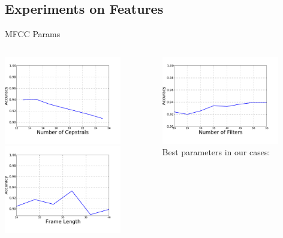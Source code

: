 \subsection{Experiments on Features}
\begin{frame}{MFCC Params}
\begin{columns}[t]
  \begin{column}[t]{0.5\textwidth}
    \begin{center}
    \includegraphics[width=0.8\textwidth]{res/mfcc-nceps.pdf}\\
    \includegraphics[width=0.8\textwidth]{res/mfcc-frame-len.pdf}
  \end{center}
  \end{column}
  \begin{column}[t]{0.5\textwidth}
    \begin{center}
    \includegraphics[width=0.8\textwidth]{res/mfcc-nfilter.pdf}\\
    Best parameters in our cases:


\end{center}
\end{column}
\end{columns}
\end{frame}
